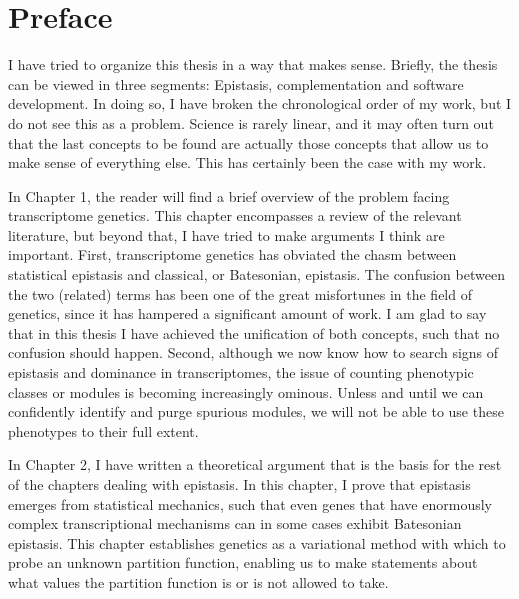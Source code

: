 \documentclass[12pt]{caltech_thesis}
\begin{document}
\begin{publishedcontent}[iknowwhattodo]

\nocite{Angeles-Albores2018a, Angeles-Albores2018b,
        Angeles-Albores2017, Angeles-Albores2016}
\nocite{Angeles2018micro}
\end{publishedcontent}



\tableofcontents
\listoffigures
\listoftables

\mainmatter{}

\chapter*{Preface}

I have tried to organize this thesis in a way that makes sense. Briefly, the
thesis can be viewed in three segments: Epistasis, complementation and software
development. In doing so, I have broken the chronological order of my work, but
I do not see this as a problem. Science is rarely linear, and it may often turn
out that the last concepts to be found are actually those concepts that allow us
to make sense of everything else. This has certainly been the case with my work.

In Chapter 1, the reader will find a brief overview of the problem facing
transcriptome genetics. This chapter encompasses a review of the relevant
literature, but beyond that, I have tried to make arguments I think are
important. First, transcriptome genetics has obviated the chasm between
statistical epistasis and classical, or Batesonian, epistasis. The confusion
between the two (related) terms has been one of the great misfortunes in the
field of genetics, since it has hampered a significant amount of work. I am glad
to say that in this thesis I have achieved the unification of both concepts,
such that no confusion should happen. Second, although we now know how to search
signs of epistasis and dominance in transcriptomes, the issue of counting
phenotypic classes or modules is becoming increasingly ominous. Unless and until
we can confidently identify and purge spurious modules, we will not be able to
use these phenotypes to their full extent.

In Chapter 2, I have written a theoretical argument that is the basis for the
rest of the chapters dealing with epistasis. In this chapter, I prove that
epistasis emerges from statistical mechanics, such that even genes that have
enormously complex transcriptional mechanisms can in some cases exhibit
Batesonian epistasis. This chapter establishes genetics as a variational method
with which to probe an unknown partition function, enabling us to make
statements about what values the partition function is or is not allowed to
take.
\end{document}
